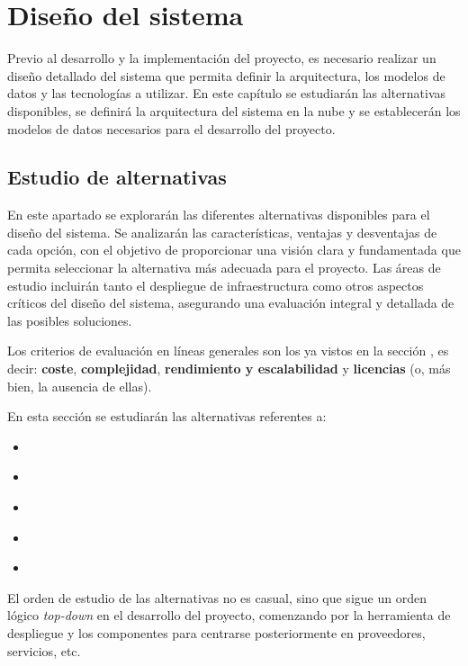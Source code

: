 \chapter{Diseño del sistema}\label{chap:diseño}
Previo al desarrollo y la implementación del proyecto, es necesario realizar un
diseño detallado del sistema que permita definir la arquitectura, los modelos de
datos y las tecnologías a utilizar. En este capítulo se estudiarán las
alternativas disponibles, se definirá la arquitectura del sistema en la nube y
se establecerán los modelos de datos necesarios para el desarrollo del proyecto.


\section{Estudio de alternativas}\label{sec:estudio}
En este apartado se explorarán las diferentes alternativas disponibles para el
diseño del sistema. Se analizarán las características, ventajas y desventajas de
cada opción, con el objetivo de proporcionar una visión clara y fundamentada que
permita seleccionar la alternativa más adecuada para el proyecto. Las áreas de
estudio incluirán tanto el despliegue de infraestructura como otros aspectos
críticos del diseño del sistema, asegurando una evaluación integral y detallada
de las posibles soluciones.

Los criterios de evaluación en líneas generales son los ya vistos en la sección
, es decir: \textbf{coste}, \textbf{complejidad},
\textbf{rendimiento y escalabilidad} y \textbf{licencias} (o, más bien, la
ausencia de ellas).

En esta sección se estudiarán las alternativas referentes a:

\begin{itemize}
	\item \textbf{}
	\item \textbf{}
	\item \textbf{}
	\item \textbf{}
	\item \textbf{}
\end{itemize}

El orden de estudio de las alternativas no es casual, sino que sigue un orden
lógico \textit{top-down} en el desarrollo del proyecto, comenzando por la
herramienta de despliegue y los componentes para centrarse posteriormente en
proveedores, servicios, etc.


